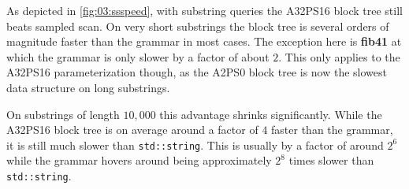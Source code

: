 \documentclass{scrartcl}
\begin{document}

As depicted in \cref{fig:03:ssspeed}, with substring queries the A32PS16 block tree still beats sampled scan.
On very short substrings the block tree is several orders of magnitude faster than the grammar in most cases.
The exception here is \textbf{fib41} at which the grammar is only slower by a factor of about $2$.
This only applies to the A32PS16 parameterization though, as the A2PS0 block tree is now the slowest data structure on long substrings.

On substrings of length $10,000$ this advantage shrinks significantly.
While the A32PS16 block tree is on average around a factor of $4$ faster than the grammar,
it is still much slower than \texttt{std::string}.
This is usually by a factor of around $2^6$ while the grammar hovers around being approximately $2^8$
times slower than \texttt{std::string}.
\end{document}
